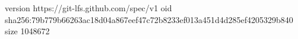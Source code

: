 version https://git-lfs.github.com/spec/v1
oid sha256:79b779b66263ac18d04a867eef47c72b8233ef013a451d4d285ef4205329b840
size 1048672
